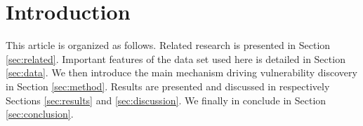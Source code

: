 \section{Introduction}
\label{sec:intro}

This article is organized as follows. Related research is presented in Section \ref{sec:related}. Important features of the data set used here is detailed in Section \ref{sec:data}. We then introduce the main mechanism driving vulnerability discovery in Section \ref{sec:method}. Results are presented and discussed in respectively Sections \ref{sec:results} and \ref{sec:discussion}. We finally in conclude in Section \ref{sec:conclusion}.



